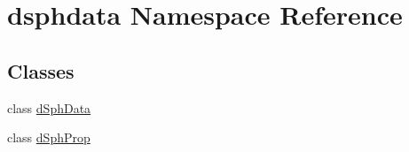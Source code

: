 \hypertarget{namespacedsphdata}{}\section{dsphdata Namespace Reference}
\label{namespacedsphdata}
\subsection*{Classes}
\begin{DoxyCompactItemize}
\item 
class \hyperlink{classdsphdata_1_1dSphData}{d\+Sph\+Data}
\item 
class \hyperlink{classdsphdata_1_1dSphProp}{d\+Sph\+Prop}
\end{DoxyCompactItemize}
